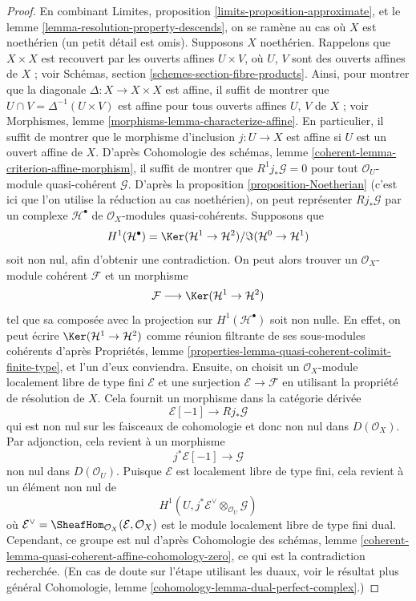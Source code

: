 \begin{proof}
En combinant Limites, proposition \ref{limits-proposition-approximate},
et le lemme \ref{lemma-resolution-property-descends},
on se ramène au cas où $X$ est noethérien (un petit détail est omis).
Supposons $X$ noethérien.
Rappelons que $X \times X$ est recouvert par les ouverts affines
$U \times V$, où $U$, $V$ sont des ouverts affines de $X$ ; voir
Schémas, section \ref{schemes-section-fibre-products}.
Ainsi, pour montrer que la diagonale $\Delta : X \to X \times X$
est affine, il suffit de montrer que $U \cap V = \Delta^{-1}(U \times V)$
est affine pour tous ouverts affines $U$, $V$ de $X$ ; voir
Morphismes, lemme \ref{morphisms-lemma-characterize-affine}.
En particulier, il suffit de montrer que le morphisme d'inclusion
$j : U \to X$ est affine si $U$ est un ouvert affine de $X$.
D'après Cohomologie des schémas, lemme \ref{coherent-lemma-criterion-affine-morphism},
il suffit de montrer que $R^1j_*\mathcal{G} = 0$ pour tout
$\mathcal{O}_U$-module quasi-cohérent $\mathcal{G}$.
D'après la proposition \ref{proposition-Noetherian} (c'est ici que l'on utilise
la réduction au cas noethérien),
on peut représenter $Rj_*\mathcal{G}$ par un complexe
$\mathcal{H}^\bullet$ de $\mathcal{O}_X$-modules quasi-cohérents.
Supposons que
$$
H^1(\mathcal{H}^\bullet) =
\Ker(\mathcal{H}^1 \to \mathcal{H}^2)/\Im(\mathcal{H}^0 \to \mathcal{H}^1)
$$
soit non nul, afin d'obtenir une contradiction. On peut alors trouver un
$\mathcal{O}_X$-module cohérent $\mathcal{F}$ et un morphisme
$$
\mathcal{F} \longrightarrow
\Ker(\mathcal{H}^1 \to \mathcal{H}^2)
$$
tel que sa composée avec la projection sur $H^1(\mathcal{H}^\bullet)$
soit non nulle. En effet, on peut écrire $\Ker(\mathcal{H}^1 \to \mathcal{H}^2)$
comme réunion filtrante de ses sous-modules cohérents d'après
Propriétés, lemme \ref{properties-lemma-quasi-coherent-colimit-finite-type},
et l'un d'eux conviendra.
Ensuite, on choisit un $\mathcal{O}_X$-module localement libre de type fini
$\mathcal{E}$ et une surjection $\mathcal{E} \to \mathcal{F}$ en utilisant
la propriété de résolution de $X$.
Cela fournit un morphisme dans la catégorie dérivée
$$
\mathcal{E}[-1] \longrightarrow Rj_*\mathcal{G}
$$
qui est non nul sur les faisceaux de cohomologie et donc non nul dans $D(\mathcal{O}_X)$.
Par adjonction, cela revient à un morphisme
$$
j^*\mathcal{E}[-1] \to \mathcal{G}
$$
non nul dans $D(\mathcal{O}_U)$. Puisque $\mathcal{E}$ est localement libre
de type fini, cela revient à un élément non nul de
$$
H^1(U, j^*\mathcal{E}^\vee \otimes_{\mathcal{O}_U} \mathcal{G})
$$
où
$\mathcal{E}^\vee = \SheafHom_{\mathcal{O}_X}(\mathcal{E}, \mathcal{O}_X)$
est le module localement libre de type fini dual. Cependant, ce groupe est nul d'après
Cohomologie des schémas, lemme
\ref{coherent-lemma-quasi-coherent-affine-cohomology-zero},
ce qui est la contradiction recherchée.
(En cas de doute sur l'étape utilisant les duaux, voir le résultat plus général
Cohomologie, lemme \ref{cohomology-lemma-dual-perfect-complex}.)
\end{proof}





